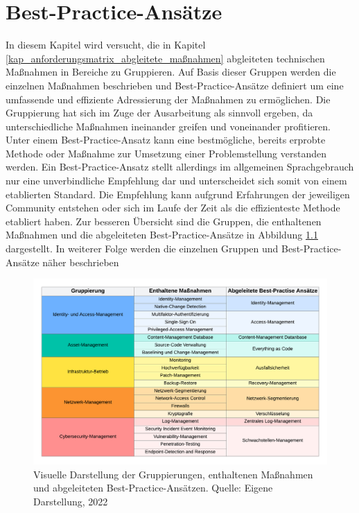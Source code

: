 \setlength{\parindent}{0em} 

\chapter{Best-Practice-Ansätze}
\label{cha:Auswertung}
In diesem Kapitel wird versucht, die in Kapitel \ref{kap_anforderungsmatrix_abgleitete_maßnahmen} abgleiteten technischen Maßnahmen in Bereiche zu Gruppieren. Auf Basis dieser Gruppen werden die einzelnen Maßnahmen beschrieben und Best-Practice-Ansätze definiert um eine umfassende und effiziente Adressierung der Maßnahmen zu ermöglichen. Die Gruppierung hat sich im Zuge der Ausarbeitung als sinnvoll ergeben, da unterschiedliche Maßnahmen ineinander greifen und voneinander profitieren.  
\bigbreak
Unter einem Best-Practice-Ansatz kann eine bestmögliche, bereits erprobte Methode oder Maßnahme zur Umsetzung einer Problemstellung verstanden werden. Ein Best-Practice-Ansatz stellt allerdings im allgemeinen Sprachgebrauch nur eine unverbindliche Empfehlung dar und unterscheidet sich somit von einem etablierten Standard. Die Empfehlung kann aufgrund Erfahrungen der jeweiligen Community entstehen oder sich im Laufe der Zeit als die effizienteste Methode etabliert haben. \autocite{duden} 
\bigbreak
Zur besseren Übersicht sind die Gruppen, die enthaltenen Maßnahmen und die abgeleiteten Best-Practice-Ansätze in Abbildung \ref{fig:bp-matrix} dargestellt. In weiterer Folge werden die einzelnen Gruppen und Best-Practice-Ansätze näher beschrieben
\begin{figure}[H]
    \centering
  \includegraphics[width=\linewidth]{images/uploads/a_figure_15.png}
  \caption{Visuelle Darstellung der Gruppierungen, enthaltenen Maßnahmen und abgeleiteten Best-Practice-Ansätzen. Quelle: Eigene Darstellung, 2022}
  \label{fig:bp-matrix}
\end{figure}

